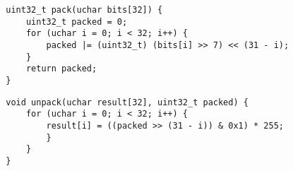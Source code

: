 \hspace{-0.9cm}
\begin{minipage}{0.45\textwidth}
    \begin{verbatim}
        uint32_t pack(uchar bits[32]) {
            uint32_t packed = 0;
            for (uchar i = 0; i < 32; i++) {
                packed |= (uint32_t) (bits[i] >> 7) << (31 - i);
            }
            return packed;
        }
    \end{verbatim}
\end{minipage}
\hspace{0.4cm}
\begin{minipage}{0.45\textwidth}
    \begin{verbatim}
        void unpack(uchar result[32], uint32_t packed) {
            for (uchar i = 0; i < 32; i++) {
                result[i] = ((packed >> (31 - i)) & 0x1) * 255;
                }
            }
        }
    \end{verbatim}
\end{minipage}